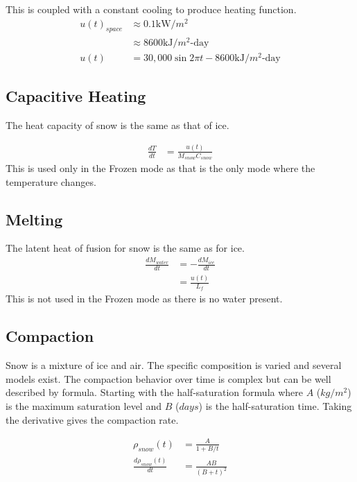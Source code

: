 \documentclass{article}
\begin{document}
This is coupled with a constant cooling to produce heating function.
\begin{align}
u(t)_{space} &\approx 0.1 \text{kW/$m^2$} \\
   &\approx 8600 \text{kJ/$m^2$-day} \\
u(t) &= 30,000 \sin{2 \pi t} - 8600 \text{kJ/$m^2$-day}
  \label{equ:power}
\end{align}


\subsection{Capacitive Heating}

The heat capacity of snow is the same as that of ice.

\begin{align}
\frac{dT}{dt} &= \frac{u(t)}{M_{snow} C_{snow}}
\label{eqn:heat-capacitance}
\end{align}
This is used only in the Frozen mode as that is
the only mode where the temperature changes.

\subsection{Melting}

The latent heat of fusion for snow is the same as for ice.
\begin{align}
\frac{dM_{water}}{dt} &= -\frac{dM_{ice}}{dt} \\
  &= \frac{u(t)}{L_f}
  \label{eqn:heat-latency}
\end{align}
This is not used in the Frozen mode as there is no water present.

\subsection{Compaction}

Snow is a mixture of ice and air.  
The specific composition is varied and several models exist.
The compaction behavior over time is complex but can
be well described by formula.
Starting with the half-saturation formula where $A$ ($kg/m^2$) is the 
maximum saturation level and $B$ ($days$) is the 
half-saturation time.
Taking the derivative gives the compaction rate.

\begin{align}
\rho_{snow}(t) &= \frac{A}{1 + B/t} \\
\frac{d\rho_{snow}(t)}{dt} &= \frac{A B}{(B + t)^2} \\
\end{align}
\end{document}
